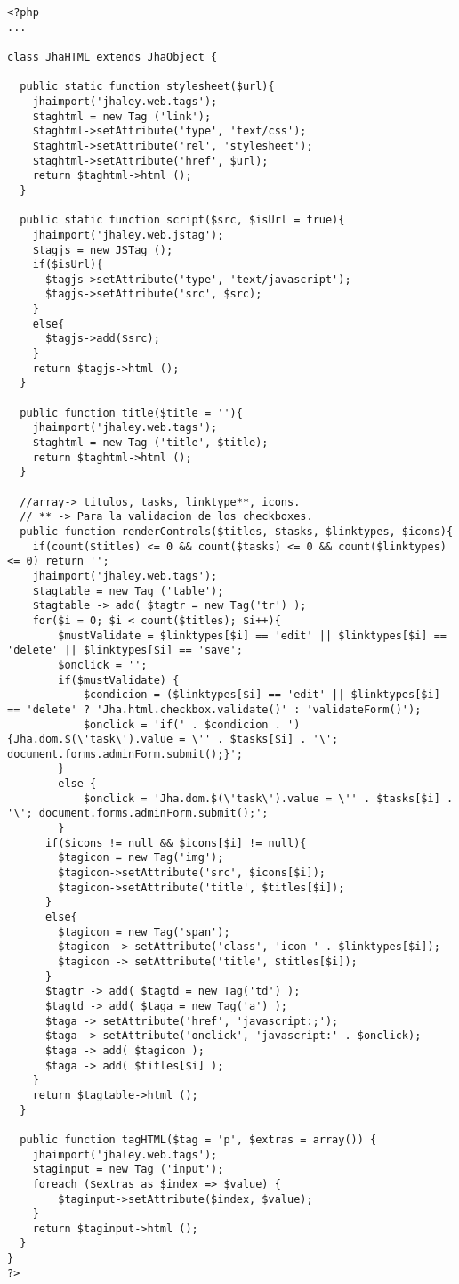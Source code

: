 \begin{lstlisting}[label=jha_renderer_head,caption=Renderizador para el tag HTML `head'.]
<?php
...

class JhaHTML extends JhaObject {
    
  public static function stylesheet($url){
  	jhaimport('jhaley.web.tags');
    $taghtml = new Tag ('link');
    $taghtml->setAttribute('type', 'text/css');
    $taghtml->setAttribute('rel', 'stylesheet');
    $taghtml->setAttribute('href', $url);
    return $taghtml->html ();
  }
    
  public static function script($src, $isUrl = true){
  	jhaimport('jhaley.web.jstag');
    $tagjs = new JSTag ();
    if($isUrl){
      $tagjs->setAttribute('type', 'text/javascript');
      $tagjs->setAttribute('src', $src);
    }
    else{
      $tagjs->add($src);
    }
    return $tagjs->html ();
  }
  
  public function title($title = ''){
  	jhaimport('jhaley.web.tags');
  	$taghtml = new Tag ('title', $title);
  	return $taghtml->html ();
  }
  
  //array-> titulos, tasks, linktype**, icons.  
  // ** -> Para la validacion de los checkboxes.
  public function renderControls($titles, $tasks, $linktypes, $icons){
  	if(count($titles) <= 0 && count($tasks) <= 0 && count($linktypes) <= 0) return '';
  	jhaimport('jhaley.web.tags');
  	$tagtable = new Tag ('table');
  	$tagtable -> add( $tagtr = new Tag('tr') );
    for($i = 0; $i < count($titles); $i++){
    	$mustValidate = $linktypes[$i] == 'edit' || $linktypes[$i] == 'delete' || $linktypes[$i] == 'save';
    	$onclick = '';
    	if($mustValidate) {
    		$condicion = ($linktypes[$i] == 'edit' || $linktypes[$i] == 'delete' ? 'Jha.html.checkbox.validate()' : 'validateForm()');
    		$onclick = 'if(' . $condicion . '){Jha.dom.$(\'task\').value = \'' . $tasks[$i] . '\'; document.forms.adminForm.submit();}';
    	}
    	else {
    		$onclick = 'Jha.dom.$(\'task\').value = \'' . $tasks[$i] . '\'; document.forms.adminForm.submit();';
    	}
      if($icons != null && $icons[$i] != null){
      	$tagicon = new Tag('img');
      	$tagicon->setAttribute('src', $icons[$i]);
      	$tagicon->setAttribute('title', $titles[$i]);
      }
      else{
      	$tagicon = new Tag('span');
      	$tagicon -> setAttribute('class', 'icon-' . $linktypes[$i]);
      	$tagicon -> setAttribute('title', $titles[$i]);
      }
      $tagtr -> add( $tagtd = new Tag('td') );
      $tagtd -> add( $taga = new Tag('a') );
      $taga -> setAttribute('href', 'javascript:;');
      $taga -> setAttribute('onclick', 'javascript:' . $onclick);
      $taga -> add( $tagicon );
      $taga -> add( $titles[$i] );
    }
    return $tagtable->html ();
  }
  
  public function tagHTML($tag = 'p', $extras = array()) {
  	jhaimport('jhaley.web.tags');
    $taginput = new Tag ('input');
    foreach ($extras as $index => $value) {
    	$taginput->setAttribute($index, $value);
    }
    return $taginput->html ();
  }
}
?>
\end{lstlisting}
